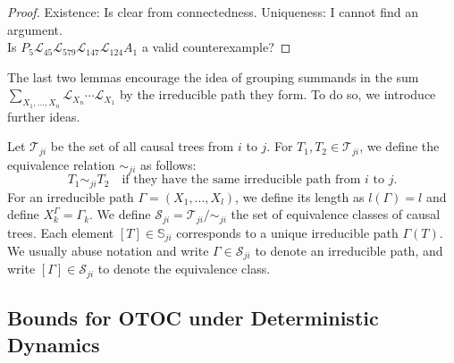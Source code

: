 \begin{proof}
  Existence: Is clear from connectedness. Uniqueness: I cannot find an argument. \\ Is \allowbreak $P_5 \mathcal{L}_{45}\mathcal{L}_{579}\mathcal{L}_{147}\mathcal{L}_{124}A_1$ a valid counterexample?
\end{proof}


The last two lemmas encourage the idea of grouping summands in the sum \(\sum_{X_1,\dots,X_n}^{} \mathcal{L}_{X_n}\cdots \mathcal{L}_{X_1}\) by the irreducible path they form. To do so, we introduce further ideas.


\begin{defn}
    Let \(\mathcal{T}_{ji}\) be the set of all causal trees from \(i\) to \(j\). For \(T_1,T_2 \in \mathcal{T}_{ji}\), we define the equivalence relation \(\sim_{ji}\) as follows:
    \[T_1 \sim_{ji} T_{2} \quad\text{if they have the same irreducible path from \(i\) to \(j\).}\]
    For an irreducible path \(\Gamma=(X_1, \dots, X_l) \), we define its length as \(l(\Gamma )=l\) and define \(X_k^\Gamma=\Gamma_k\). We define \(\mathcal{S}_{ji}=\mathcal{T}_{ji}/\sim_{ji}\) the set of equivalence classes of causal trees. Each element \([T]\in \mathbb{S}_{ji}\) corresponds to a unique irreducible path \(\Gamma(T)\). We usually abuse notation and write \(\Gamma \in \mathcal{S}_{ji}\) to denote an irreducible path, and write \([\Gamma ] \in \mathcal{S}_{ji}\) to denote the equivalence class.
\end{defn}


\subsection{Bounds for OTOC under Deterministic Dynamics}



